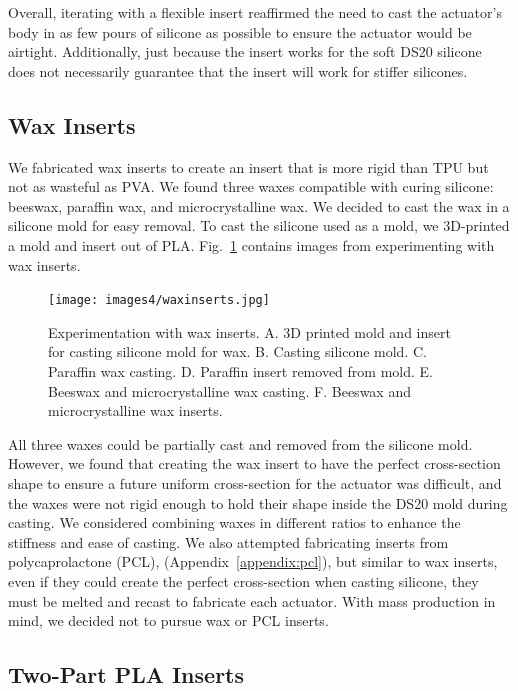 Overall, iterating with a flexible insert reaffirmed the need to cast the actuator's body in as few pours of silicone as possible to ensure the actuator would be airtight. Additionally, just because the insert works for the soft DS20 silicone does not necessarily guarantee that the insert will work for stiffer silicones. 

\clearpage
\subsection{Wax Inserts}

We fabricated wax inserts to create an insert that is more rigid than TPU but not as wasteful as PVA. We found three waxes compatible with curing silicone: beeswax, paraffin wax, and microcrystalline wax. We decided to cast the wax in a silicone mold for easy removal. To cast the silicone used as a mold, we 3D-printed a mold and insert out of PLA. Fig.~\ref{fig:waxinserts} contains images from experimenting with wax inserts. \\

\begin{figure}[ht!]
    \centering
    \texttt{[image: images4/waxinserts.jpg]}
    \caption{Experimentation with wax inserts. A. 3D printed mold and insert for casting silicone mold for wax. B. Casting silicone mold. C. Paraffin wax casting. D. Paraffin insert removed from mold. E. Beeswax and microcrystalline wax casting. F. Beeswax and microcrystalline wax inserts.}
    \label{fig:waxinserts}
\end{figure}

All three waxes could be partially cast and removed from the silicone mold. However, we found that creating the wax insert to have the perfect cross-section shape to ensure a future uniform cross-section for the actuator was difficult, and the waxes were not rigid enough to hold their shape inside the DS20 mold during casting. We considered combining waxes in different ratios to enhance the stiffness and ease of casting. We also attempted fabricating inserts from polycaprolactone (PCL), (Appendix~\ref{appendix:pcl}), but similar to wax inserts, even if they could create the perfect cross-section when casting silicone, they must be melted and recast to fabricate each actuator. 
With mass production in mind, we decided not to pursue wax or PCL inserts. 

\subsection{Two-Part PLA Inserts}

